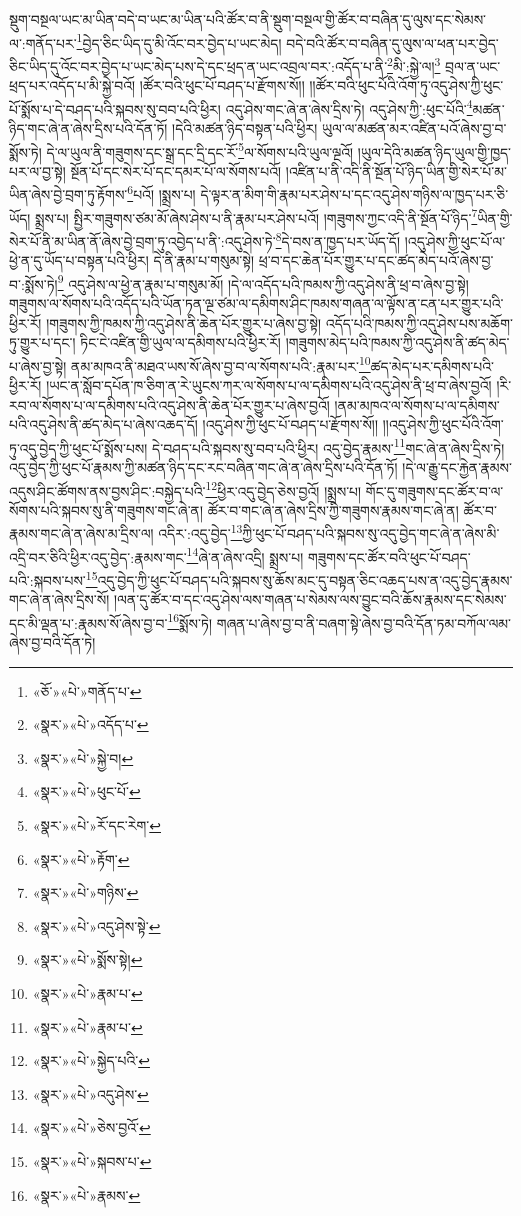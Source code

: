 སྡུག་བསྔལ་ཡང་མ་ཡིན་བདེ་བ་ཡང་མ་ཡིན་པའི་ཚོར་བ་ནི་སྡུག་བསྔལ་གྱི་ཚོར་བ་བཞིན་དུ་ལུས་དང་སེམས་ལ་:གནོད་པར་\footnote{«ཅོ་»«པེ་»གནོད་པ་}བྱེད་ཅིང་ཡིད་དུ་མི་འོང་བར་བྱེད་པ་ཡང་མེད། བདེ་བའི་ཚོར་བ་བཞིན་དུ་ལུས་ལ་ཕན་པར་བྱེད་ཅིང་ཡིད་དུ་འོང་བར་བྱེད་པ་ཡང་མེད་པས་དེ་དང་ཕྲད་ན་ཡང་འབྲལ་བར་:འདོད་པ་ནི་\footnote{«སྣར་»«པེ་»འདོད་པ་}མི་:སྐྱེ་ལ།\footnote{«སྣར་»«པེ་»སྐྱེ་བ།} བྲལ་ན་ཡང་ཕྲད་པར་འདོད་པ་མི་སྐྱེ་བའོ། །ཚོར་བའི་ཕུང་པོ་བཤད་པ་རྫོགས་སོ།། །།ཚོར་བའི་ཕུང་པོའི་འོག་ཏུ་འདུ་ཤེས་ཀྱི་ཕུང་པོ་སྨོས་པ་དེ་བཤད་པའི་སྐབས་སུ་བབ་པའི་ཕྱིར། འདུ་ཤེས་གང་ཞེ་ན་ཞེས་དྲིས་ཏེ། འདུ་ཤེས་ཀྱི་:ཕུང་པོའི་\footnote{«སྣར་»«པེ་»ཕུང་པོ་}མཚན་ཉིད་གང་ཞེ་ན་ཞེས་དྲིས་པའི་དོན་ཏོ། །དེའི་མཚན་ཉིད་བསྟན་པའི་ཕྱིར། ཡུལ་ལ་མཚན་མར་འཛིན་པའོ་ཞེས་བྱ་བ་སྨོས་ཏེ། དེ་ལ་ཡུལ་ནི་གཟུགས་དང་སྒྲ་དང་དྲི་དང་རོ་\footnote{«སྣར་»«པེ་»རོ་དང་རེག་}ལ་སོགས་པའི་ཡུལ་ལྔའོ། །ཡུལ་དེའི་མཚན་ཉིད་ཡུལ་གྱི་ཁྱད་པར་ལ་བྱ་སྟེ། སྔོན་པོ་དང་སེར་པོ་དང་དམར་པོ་ལ་སོགས་པའོ། །འཛིན་པ་ནི་འདི་ནི་སྔོན་པོ་ཉིད་ཡིན་གྱི་སེར་པོ་མ་ཡིན་ཞེས་བྱེ་བྲག་ཏུ་རྟོགས་\footnote{«སྣར་»«པེ་»རྟོག་}པའོ། །སྨྲས་པ། དེ་ལྟར་ན་མིག་གི་རྣམ་པར་ཤེས་པ་དང་འདུ་ཤེས་གཉིས་ལ་ཁྱད་པར་ཅི་ཡོད། སྨྲས་པ། སྤྱིར་གཟུགས་ཙམ་མོ་ཞེས་ཤེས་པ་ནི་རྣམ་པར་ཤེས་པའོ། །གཟུགས་ཀྱང་འདི་ནི་སྔོན་པོ་ཉིད་\footnote{«སྣར་»«པེ་»གཉིས་}ཡིན་གྱི་སེར་པོ་ནི་མ་ཡིན་ནོ་ཞེས་བྱེ་བྲག་ཏུ་འབྱེད་པ་ནི་:འདུ་ཤེས་ཏེ་\footnote{«སྣར་»«པེ་»འདུ་ཤེས་སྟེ་}དེ་བས་ན་ཁྱད་པར་ཡོད་དོ། །འདུ་ཤེས་ཀྱི་ཕུང་པོ་ལ་ཕྱེ་ན་དུ་ཡོད་པ་བསྟན་པའི་ཕྱིར། དེ་ནི་རྣམ་པ་གསུམ་སྟེ། ཕྲ་བ་དང་ཆེན་པོར་གྱུར་པ་དང་ཚད་མེད་པའོ་ཞེས་བྱ་བ་:སྨོས་ཏེ།\footnote{«སྣར་»«པེ་»སྨོས་སྟེ།} འདུ་ཤེས་ལ་ཕྱེ་ན་རྣམ་པ་གསུམ་མོ། །དེ་ལ་འདོད་པའི་ཁམས་ཀྱི་འདུ་ཤེས་ནི་ཕྲ་བ་ཞེས་བྱ་སྟེ། གཟུགས་ལ་སོགས་པའི་འདོད་པའི་ཡོན་ཏན་ལྔ་ཙམ་ལ་དམིགས་ཤིང་ཁམས་གཞན་ལ་ལྟོས་ན་ངན་པར་གྱུར་པའི་ཕྱིར་རོ། །གཟུགས་ཀྱི་ཁམས་ཀྱི་འདུ་ཤེས་ནི་ཆེན་པོར་གྱུར་པ་ཞེས་བྱ་སྟེ། འདོད་པའི་ཁམས་ཀྱི་འདུ་ཤེས་པས་མཆོག་ཏུ་གྱུར་པ་དང་། ཏིང་ངེ་འཛིན་གྱི་ཡུལ་ལ་དམིགས་པའི་ཕྱིར་རོ། །གཟུགས་མེད་པའི་ཁམས་ཀྱི་འདུ་ཤེས་ནི་ཚད་མེད་པ་ཞེས་བྱ་སྟེ། ནམ་མཁའ་ནི་མཐའ་ཡས་སོ་ཞེས་བྱ་བ་ལ་སོགས་པའི་:རྣམ་པར་\footnote{«སྣར་»«པེ་»རྣམ་པ་}ཚད་མེད་པར་དམིགས་པའི་ཕྱིར་རོ། །ཡང་ན་སློབ་དཔོན་ཁ་ཅིག་ན་རེ་ཡུངས་ཀར་ལ་སོགས་པ་ལ་དམིགས་པའི་འདུ་ཤེས་ནི་ཕྲ་བ་ཞེས་བྱའོ། །རི་རབ་ལ་སོགས་པ་ལ་དམིགས་པའི་འདུ་ཤེས་ནི་ཆེན་པོར་གྱུར་པ་ཞེས་བྱའོ། །ནམ་མཁའ་ལ་སོགས་པ་ལ་དམིགས་པའི་འདུ་ཤེས་ནི་ཚད་མེད་པ་ཞེས་འཆད་དོ། །འདུ་ཤེས་ཀྱི་ཕུང་པོ་བཤད་པ་རྫོགས་སོ།། །།འདུ་ཤེས་ཀྱི་ཕུང་པོའི་འོག་ཏུ་འདུ་བྱེད་ཀྱི་ཕུང་པོ་སྨོས་པས། དེ་བཤད་པའི་སྐབས་སུ་བབ་པའི་ཕྱིར། འདུ་བྱེད་རྣམས་\footnote{«སྣར་»«པེ་»རྣམ་པ་}གང་ཞེ་ན་ཞེས་དྲིས་ཏེ། འདུ་བྱེད་ཀྱི་ཕུང་པོ་རྣམས་ཀྱི་མཚན་ཉིད་དང་རང་བཞིན་གང་ཞེ་ན་ཞེས་དྲིས་པའི་དོན་ཏོ། །དེ་ལ་རྒྱུ་དང་རྐྱེན་རྣམས་འདུས་ཤིང་ཚོགས་ནས་བྱས་ཤིང་:བསྐྱེད་པའི་\footnote{«སྣར་»«པེ་»སྐྱེད་པའི་}ཕྱིར་འདུ་བྱེད་ཅེས་བྱའོ། །སྨྲས་པ། གོང་དུ་གཟུགས་དང་ཚོར་བ་ལ་སོགས་པའི་སྐབས་སུ་ནི་གཟུགས་གང་ཞེ་ན། ཚོར་བ་གང་ཞེ་ན་ཞེས་དྲིས་ཀྱི་གཟུགས་རྣམས་གང་ཞེ་ན། ཚོར་བ་རྣམས་གང་ཞེ་ན་ཞེས་མ་དྲིས་ལ། འདིར་:འདུ་བྱེད་\footnote{«སྣར་»«པེ་»འདུ་ཤེས་}ཀྱི་ཕུང་པོ་བཤད་པའི་སྐབས་སུ་འདུ་བྱེད་གང་ཞེ་ན་ཞེས་མི་འདྲི་བར་ཅིའི་ཕྱིར་འདུ་བྱེད་:རྣམས་གང་\footnote{«སྣར་»«པེ་»ཅེས་བྱའོ་}ཞེ་ན་ཞེས་འདྲི། སྨྲས་པ། གཟུགས་དང་ཚོར་བའི་ཕུང་པོ་བཤད་པའི་:སྐབས་པས་\footnote{«སྣར་»«པེ་»སྐབས་པ་}འདུ་བྱེད་ཀྱི་ཕུང་པོ་བཤད་པའི་སྐབས་སུ་ཆོས་མང་དུ་བསྟན་ཅིང་འཆད་པས་ན་འདུ་བྱེད་རྣམས་གང་ཞེ་ན་ཞེས་དྲིས་སོ། །ལན་དུ་ཚོར་བ་དང་འདུ་ཤེས་ལས་གཞན་པ་སེམས་ལས་བྱུང་བའི་ཆོས་རྣམས་དང་སེམས་དང་མི་ལྡན་པ་:རྣམས་སོ་ཞེས་བྱ་བ་\footnote{«སྣར་»«པེ་»རྣམས་}སྨོས་ཏེ། གཞན་པ་ཞེས་བྱ་བ་ནི་བཞག་སྟེ་ཞེས་བྱ་བའི་དོན་ཏམ་བཀོལ་ལམ་ཞེས་བྱ་བའི་དོན་ཏེ། 